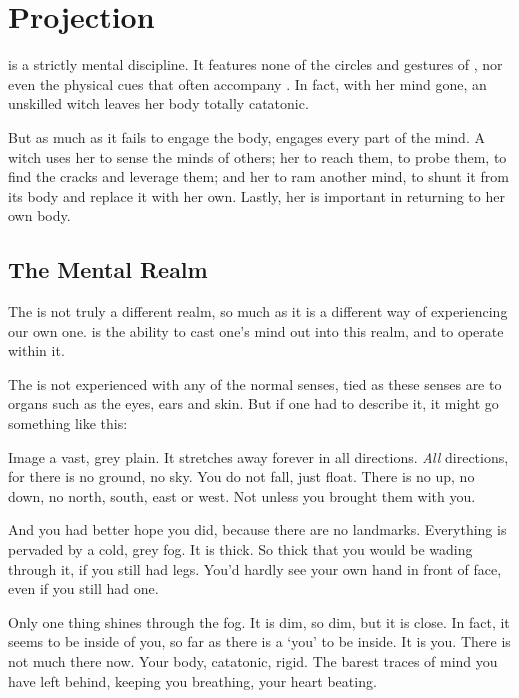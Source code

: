\chapter{Projection}

 is a strictly mental discipline.
It features none of the circles and gestures of , nor even the physical cues that often accompany .
In fact, with her mind gone, an unskilled witch leaves her body totally catatonic.

But as much as it fails to engage the body,  engages every part of the mind.
A witch uses her  to sense the minds of others; her  to reach them, to probe them, to find the cracks and leverage them; and her  to ram another mind, to shunt it from its body and replace it with her own.
Lastly, her  is important in returning to her own body.

\section{The Mental Realm}

The {\mentalrealm} is not truly a different realm, so much as it is a different way of experiencing our own one.
 is the ability to cast one's mind out into this realm, and to operate within it.

The {\mentalrealm} is not experienced with any of the normal senses, tied as these senses are to organs such as the eyes, ears and skin.
But if one had to describe it, it might go something like this:

Image a vast, grey plain.
It stretches away forever in all directions.
\emph{All} directions, for there is no ground, no sky.
You do not fall, just float.
There is no up, no down, no north, south, east or west.
Not unless you brought them with you.

And you had better hope you did, because there are no landmarks.
Everything is pervaded by a cold, grey fog.
It is thick.
So thick that you would be wading through it, if you still had legs.
You'd hardly see your own hand in front of face, even if you still had one.

Only one thing shines through the fog.
It is dim, so dim, but it is close.
In fact, it seems to be inside of you, so far as there is a `you' to be inside.
It is you.
There is not much there now.
Your body, catatonic, rigid.
The barest traces of mind you have left behind, keeping you breathing, your heart beating.

